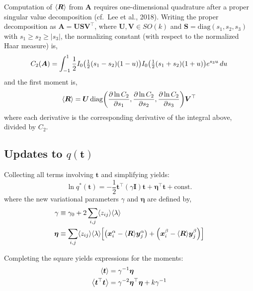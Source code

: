 \documentclass{article}
\newcommand{\lh}{\mathopen{}\mathclose\bgroup\left}
\newcommand{\rh}{\aftergroup\egroup\right}
\newcommand{\E}[1]{\lh\langle #1 \rh\rangle}
\newcommand{\m}[1]{\boldsymbol{#1}}
\newcommand{\const}{\mathrm{const.}}
\begin{document}
Computation of $\E{\m{R}}$ from $\m{A}$ requires one-dimensional quadrature
after a proper singular value decomposition
(cf.~Lee et al., 2018).
Writing the proper decomposition as
$\m{A} = \m{U} \m{S} \m{V}^\top$, where $\m{U}, \m{V} \in SO(k)$
and $\m{S} = \mathrm{diag}(s_1, s_2, s_3)$ with $s_1 \ge s_2 \ge |s_3|$,
the normalizing constant (with respect to the normalized Haar measure)
is,
\begin{equation}
C_2(\m{A}) = \int_{-1}^{1}
 \frac{1}{2}
 I_0\lh( \tfrac{1}{2} (s_1 - s_2) (1 - u) \rh)
 I_0\lh( \tfrac{1}{2} (s_1 + s_2) (1 + u) \rh)
 e^{s_3 u} \, du
\end{equation}
and the first moment is,
\begin{equation}
\E{\m{R}} = \m{U} \,
 \mathrm{diag}\lh(
  \frac{\partial \ln C_2}{\partial s_1},
  \frac{\partial \ln C_2}{\partial s_2},
  \frac{\partial \ln C_2}{\partial s_3}
 \rh) \m{V}^\top
\end{equation}
where each derivative is the corresponding derivative of the
integral above, divided by $C_2$.

\subsection{Updates to $q(\m{t})$}
Collecting all terms involving $\m{t}$ and simplifying yields:
\begin{equation}
\ln q^*(\m{t}) =
 -\frac{1}{2} \m{t}^\top (\gamma \m{I}) \m{t}
 +\m{\eta}^\top \m{t}
 +\const{}
\end{equation}
where the new variational parameters $\gamma$ and $\m{\eta}$ are defined by,
\begin{equation}
\begin{aligned}
\gamma &\equiv \gamma_0 + 2 \sum_{i,j} \E{z_{ij}} \E{\lambda}
\\
\m{\eta} &\equiv
 \sum_{i,j} \E{z_{ij}} \E{\lambda} \lh[
   \lh( \m{x}_i^\alpha - \E{\m{R}} \m{y}_j^\alpha \rh)
  +\lh( \m{x}_i^\beta - \E{\m{R}} \m{y}_j^\beta \rh)
 \rh]
\end{aligned}
\end{equation}

Completing the square yields expressions for the moments:
\begin{equation}
\begin{aligned}
\E{\m{t}} &= \gamma^{-1} \m{\eta}
\\
\E{\m{t}^\top \m{t}} &= \gamma^{-2} \m{\eta}^\top \m{\eta} + k \gamma^{-1}
\end{aligned}
\end{equation}
\end{document}
